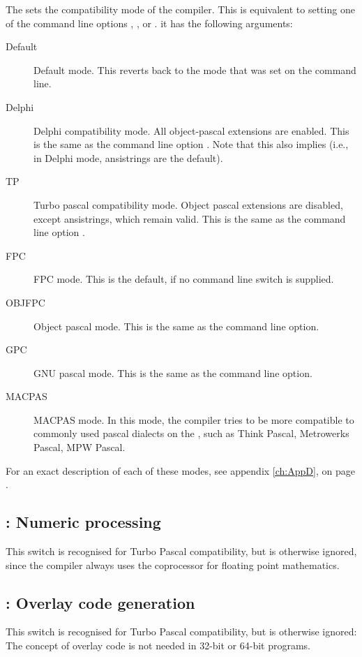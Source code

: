 The  sets the compatibility mode of the compiler. This
is equivalent to setting one of the command line options ,
,  or . it has the following arguments:
\begin{description}
\item[Default] Default mode. This reverts back to the mode that was set on
the command line.
\item[Delphi] Delphi compatibility mode. All object-pascal extensions are
enabled. This is the same as the command line option . Note that
this also implies  (i.e., in Delphi mode, ansistrings are
the default).
\item[TP] Turbo pascal compatibility mode. Object pascal extensions are
disabled, except ansistrings, which remain valid.
This is the same as the command line option .
\item[FPC] FPC mode. This is the default, if no command line switch is
supplied.
\item[OBJFPC] Object pascal mode. This is the same as the 
command line option.
\item[GPC] GNU pascal mode. This is the same as the  command line
option.
\item[MACPAS] MACPAS mode. In this mode, the compiler tries to be more compatible
to commonly used pascal dialects on the \macos, such as Think Pascal, Metrowerks 
Pascal, MPW Pascal. 
\end{description}

For an exact description of each of these modes, see appendix \ref{ch:AppD},
on page \pageref{ch:AppD}.

\subsection{ : Numeric processing }

This switch is recognised for Turbo Pascal compatibility, but is otherwise
ignored, since the compiler always uses the coprocessor for floating point
mathematics.

\subsection{ : Overlay code generation }

This switch is recognised for Turbo Pascal compatibility, but is otherwise
ignored: The concept of overlay code is not needed in 32-bit or 64-bit
programs.

